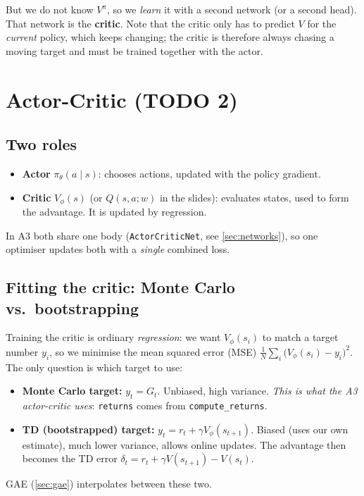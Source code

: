 \documentclass[11pt,a4paper]{article}
\newcommand{\pit}{\pi_\theta}
\newcommand{\code}[1]{\texttt{#1}}
\begin{document}
But we do not know $V^\pi$, so we \emph{learn} it with a second network (or a second head). That network is the \textbf{critic}. Note that the critic only has to predict $V$ for the \emph{current} policy, which keeps changing; the critic is therefore always chasing a moving target and must be trained together with the actor.

\section{Actor-Critic (TODO 2)}\label{sec:ac}

\subsection{Two roles}
\begin{itemize}[nosep]
  \item \textbf{Actor} $\pit(a\mid s)$: chooses actions, updated with the policy gradient.
  \item \textbf{Critic} $V_\phi(s)$ (or $Q(s,a;w)$ in the slides): evaluates states, used to form the advantage. It is updated by regression.
\end{itemize}
In A3 both share one body (\code{ActorCriticNet}, see \cref{sec:networks}), so one optimiser updates both with a \emph{single} combined loss.

\subsection{Fitting the critic: Monte Carlo vs.\ bootstrapping}
Training the critic is ordinary \emph{regression}: we want $V_\phi(s_i)$ to match a target number $y_i$, so we minimise the mean squared error (MSE) $\frac1N\sum_i\big(V_\phi(s_i)-y_i\big)^2$. The only question is which target to use:
\begin{itemize}[nosep]
  \item \textbf{Monte Carlo target:} $y_t = G_t$. Unbiased, high variance. \emph{This is what the A3 actor-critic uses}: \code{returns} comes from \code{compute\_returns}.
  \item \textbf{TD (bootstrapped) target:} $y_t = r_t+\gamma V_\phi(s_{t+1})$. Biased (uses our own estimate), much lower variance, allows online updates. The advantage then becomes the TD error $\delta_t = r_t+\gamma V(s_{t+1})-V(s_t)$.
\end{itemize}
GAE (\cref{sec:gae}) interpolates between these two.
\end{document}
